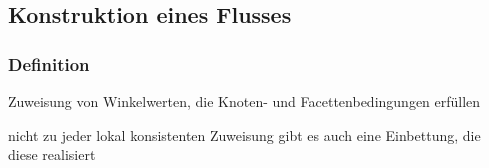 \subsection{Konstruktion eines Flusses}
\begin{minipage}{0.4\textwidth}
	
\end{minipage}
\begin{minipage}{0.55\textwidth}
	\subsubsection{Definition}
	\begin{description}[itemsep=-1pt]
		\item[lokal konstistent:] Zuweisung von Winkelwerten, die Knoten- und Facettenbedingungen erfüllen\\
		\item[\textbf{\color{red}\Large !}] nicht zu jeder lokal konsistenten Zuweisung gibt es auch eine Einbettung, die diese realisiert
	\end{description}
\end{minipage}\\
